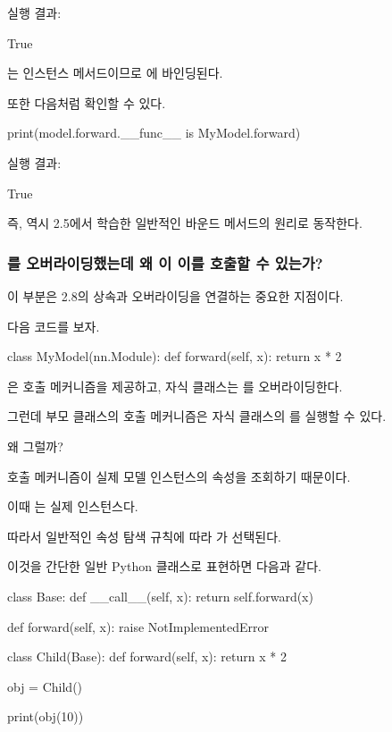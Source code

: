 실행 결과:

\begin{dhkzsh}
True
\end{dhkzsh}

는 인스턴스 메서드이므로 에 바인딩된다.

또한 다음처럼 확인할 수 있다.

\begin{dhkcode}
print(model.forward.__func__ is MyModel.forward)
\end{dhkcode}

실행 결과:

\begin{dhkzsh}
True
\end{dhkzsh}

즉,  역시 2.5에서 학습한 일반적인 바운드 메서드의 원리로 동작한다.

\subsubsection{를 오버라이딩했는데 왜 이 이를 호출할 수 있는가?}

이 부분은 2.8의 상속과 오버라이딩을 연결하는 중요한 지점이다.

다음 코드를 보자.

\begin{dhkcode}
class MyModel(nn.Module):
    def forward(self, x):
        return x * 2
\end{dhkcode}

은 호출 메커니즘을 제공하고, 자식 클래스는 를 오버라이딩한다.

그런데 부모 클래스의 호출 메커니즘은 자식 클래스의 를 실행할 수 있다.

왜 그럴까?

호출 메커니즘이 실제 모델 인스턴스의  속성을 조회하기 때문이다.

이때 는 실제  인스턴스다.

따라서 일반적인 속성 탐색 규칙에 따라 가 선택된다.

이것을 간단한 일반 Python 클래스로 표현하면 다음과 같다.

\begin{dhkcode}
class Base:
    def __call__(self, x):
        return self.forward(x)

    def forward(self, x):
        raise NotImplementedError


class Child(Base):
    def forward(self, x):
        return x * 2

obj = Child()

print(obj(10))
\end{dhkcode}

